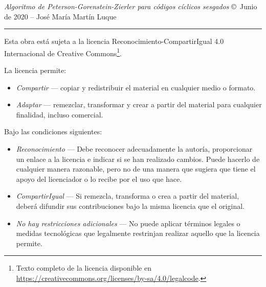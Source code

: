 \thispagestyle{empty}

\hfill

\vfill

\textit{Algoritmo de Peterson-Gorenstein-Zierler para códigos cíclicos sesgados} \; \copyright\ Junio de 2020 -- José María Martín Luque \\ \bigskip

\par\vspace*{\dimexpr-\parskip-\baselineskip+6pt}
\noindent\rule{\textwidth}{0.5pt}

Esta obra está sujeta a la licencia Reconocimiento-CompartirIgual 4.0 Internacional de Creative Commons\footnote{Texto completo de la licencia disponible en \url{https://creativecommons.org/licenses/by-sa/4.0/legalcode}.}.

La licencia permite:
\begin{itemize}
	\item[] \emph{Compartir} --- copiar y redistribuir el material en cualquier medio o formato.
	\item[] \emph{Adaptar} --- remezclar, transformar y crear a partir del material
para cualquier finalidad, incluso comercial.
\end{itemize}

Bajo las condiciones siguientes:
\begin{itemize}
	\item[] \emph{Reconocimiento} --- Debe reconocer adecuadamente la autoría, proporcionar un enlace a la licencia e indicar si se han realizado cambios. Puede hacerlo de cualquier manera razonable, pero no de una manera que sugiera que tiene el apoyo del licenciador o lo recibe por el uso que hace. 
	\item[] \emph{CompartirIgual} --- Si remezcla, transforma o crea a partir del material, deberá difundir sus contribuciones bajo la misma licencia que el original.
	\item[] \emph{No hay restricciones adicionales} --- No puede aplicar términos legales o medidas tecnológicas que legalmente restrinjan realizar aquello que la licencia permite.
\end{itemize}
